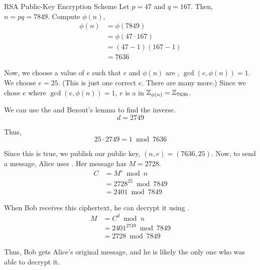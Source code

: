 \begin{example}{RSA Public-Key Encryption Scheme}
  Let $p = 47$ and $q = 167$.
  Then, $n = pq = 7849$.
  Compute $\phi(n)$,
  \begin{equation*}
    \begin{aligned}
      \phi(n) &= \phi(7849) \\
      &= \phi(47 \cdot 167) \\
      &= (47 - 1) (167 - 1) \\
      &= 7636
    \end{aligned}
  \end{equation*}

  Now, we choose a value of $e$ such that $e$ and $\phi(n)$ are , $\gcd(e, \phi(n)) = 1$.
  We choose $e=25$. (This is just one correct $e$. There are many more.)
  Since we chose $e$ where $\gcd(e, \phi(n)) = 1$, $e$ is a  in $\operatorname{\mathbb{Z}}_{\phi(n)} = \operatorname{\mathbb{Z}}_{7636}$.

  We can use the  and Bezout's lemma to find the inverse.
  \begin{equation*}
    d = 2749
  \end{equation*}

  Thus,
  \begin{equation*}
    25 \cdot 2749 = 1 \bmod 7636
  \end{equation*}

  Since this is true, we publish our public key, $(n, e) = (7636, 25)$.
  \tcblower{}
  Now, to send a message, Alice uses .
  Her message has $M = 2728$.
  \begin{equation*}
    \begin{aligned}
      C &= M^{e} \bmod n \\
      &= 2728^{25} \bmod 7849 \\
      &= 2401 \bmod 7849
    \end{aligned}
  \end{equation*}

  When Bob receives this ciphertext, he can decrypt it using .
  \begin{equation*}
    \begin{aligned}
      M &= C^{d} \bmod n \\
      &= 2401^{2749} \bmod 7849 \\
      &= 2728 \bmod 7849
    \end{aligned}
  \end{equation*}

  Thus, Bob gets Alice's original message, and he is likely the only one who was able to decrypt it.
\end{example}

